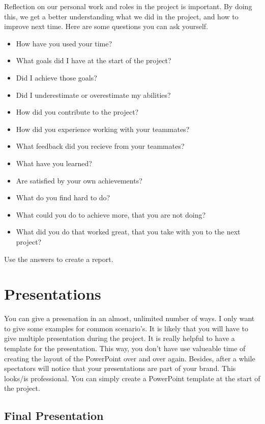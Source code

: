 \documentclass[10pt]{report}
\begin{document}
Reflection on our personal work and roles in the project is important. By doing this, we get a better understanding what we did in the project, and how to improve next time. Here are some questions you can ask yourself. 

\begin{itemize}
	\item How have you used your time?
	\item What goals did I have at the start of the project?
	\item Did I achieve those goals?
	\item Did I underestimate or overestimate my abilities?
	\item How did you contribute to the project?
	\item How did you experience working with your teammates?
	\item What feedback did you recieve from your teammates?
	\item What have you learned?
	\item Are satisfied by your own achievements?
	\item What do you find hard to do?
	\item What could you do to achieve more, that you are not doing?
	\item What did you do that worked great, that you take with you to the next project?
\end{itemize}

\noindent Use the answers to create a report.

\newpage

\section{Presentations}

You can give a presenation in an almost, unlimited number of ways. I only want to give some examples for common scenario's. It is likely that you will have to give multiple presentation during the project. It is really helpful to have a template for the presentation. This way, you don't have use valueable time of creating the layout of the PowerPoint over and over again. Besides, after a while spectators will notice that your presentations are part of your brand. This looks/is professional. You can simply create a PowerPoint template at the start of the project.

\subsection{Final Presentation}
\end{document}
